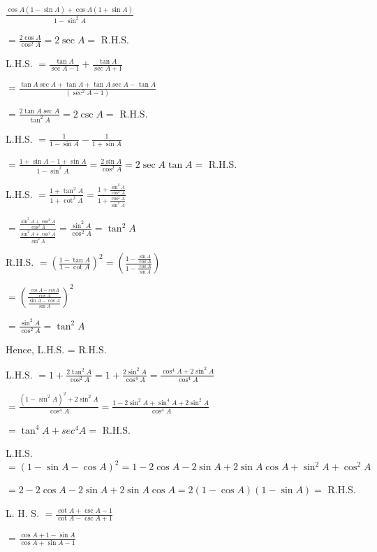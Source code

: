     $\frac{\cos A(1 - \sin A) + \cos A(1 + \sin A)}{1 - \sin^2A}$

    $= \frac{2\cos A}{\cos^2A} = 2\sec A =$ R.H.S.

\item L.H.S. $= \frac{\tan A}{\sec A - 1} + \frac{\tan A}{\sec A + 1}$

    $= \frac{\tan A\sec A + \tan A + \tan A\sec A - \tan A}{(\sec^2A - 1)}$

    $= \frac{2\tan A\sec A}{\tan^2 A} = 2\csc A =$ R.H.S.

\item L.H.S. $= \frac{1}{1 - \sin A} - \frac{1}{1 + \sin A}$

    $= \frac{1 + \sin A - 1 + \sin A}{1 - \sin^2A} = \frac{2\sin A}{\cos^2A} = 2\sec A\tan A =$ R.H.S.

\item L.H.S. $= \frac{1 + \tan^2 A}{1 + \cot^2 A} = \frac{1 + \frac{\sin^2A}{\cos^2A}}{1 + \frac{\cos^2A}{\sin^2A}}$

    $= \frac{\frac{\sin^2A + \cos^2A}{\cos^2A}}{\frac{\sin^2A + \cos^2A}{\sin^2A}} = \frac{\sin^2A}{\cos^2A} = \tan^2A$

    R.H.S. $= \left(\frac{1 - \tan A}{1 - \cot A}\right)^2 = \left(\frac{1 - \frac{\sin A}{\cos A}}{1 - \frac{\cos A}{\sin A}}\right)$

    $= \left(\frac{\frac{\cos A - sin A}{\cos A}}{\frac{\sin A - \cos A}{\sin A}}\right)^2$

    $= \frac{\sin^2A}{\cos^2A} = \tan^2A$

    Hence, L.H.S. = R.H.S.

\item L.H.S. $= 1 + \frac{2\tan^2 A}{\cos^2 A} = 1 + \frac{2\sin^2A}{\cos^4A} = \frac{\cos^4A + 2\sin^2A}{\cos^4A}$

    $= \frac{(1 - \sin^2A)^2 + 2\sin^2A}{\cos^4A} = \frac{1 - 2\sin^2A + \sin^4A + 2\sin^2A}{\cos^4A}$

    $= \tan^4A + sec^4A =$ R.H.S.

\item L.H.S. $= (1 - \sin A - \cos A)^2 = 1 - 2\cos A - 2\sin A + 2\sin A\cos A + \sin^2A + \cos^2A$

    $= 2 - 2\cos A - 2\sin A + 2\sin A\cos A = 2(1 - \cos A)(1 - \sin A) =$ R.H.S.

\item L. H. S. $= \frac{\cot A + \csc A - 1}{\cot A - \csc A + 1}$

    $= \frac{\cos A + 1 - \sin A}{\cos A + \sin A - 1}$

